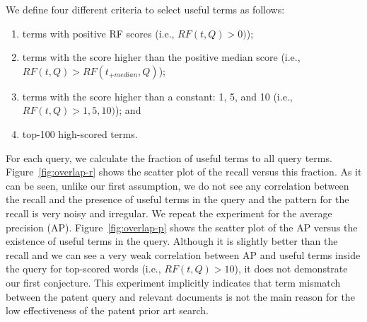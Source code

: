 We define four different criteria to select useful terms as follows:
\begin{enumerate}
\item terms with positive RF scores (i.e., $ RF(t, Q)>0) $);
\item terms with the score higher than the positive median score (i.e., $ RF(t, Q)>RF(t_{+median}, Q) $);
\item terms with the score higher than a constant: 1, 5, and 10 (i.e., $ RF(t, Q)>1, 5, 10) $); and
\item top-100 high-scored terms.
\end{enumerate}
For each query, we calculate the fraction of useful terms to all query terms. 
Figure~\ref{fig:overlap-r} shows the scatter plot of the recall versus this fraction. 
As it can be seen, unlike our first assumption, we do not see any correlation between the recall and the presence of useful terms in the query and the pattern for the recall is very noisy and irregular. 
We repeat the experiment for the average precision (AP). Figure~\ref{fig:overlap-p} shows the scatter plot of the AP versus the existence of useful terms in the query. Although it is slightly better than the recall and we can see a very weak correlation between AP and useful terms inside the query for top-scored words (i.e., $RF(t, Q)>10$), it does not demonstrate our first conjecture. 
This experiment implicitly indicates that term mismatch between the patent query and relevant documents is 
not the main reason for the low effectiveness of the patent prior art search. 
